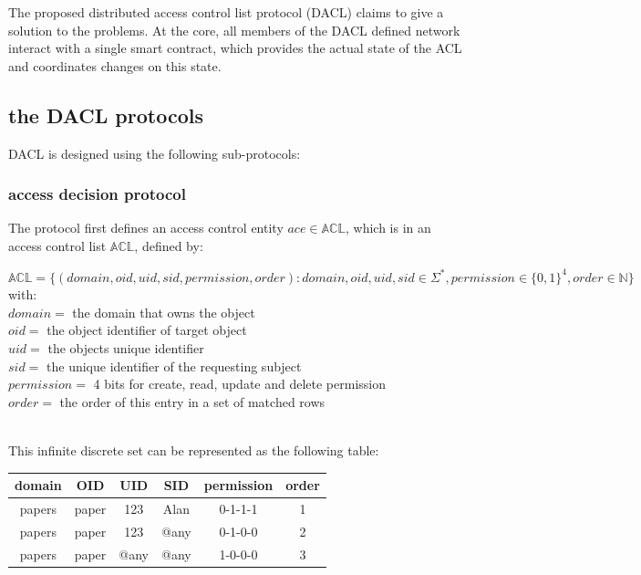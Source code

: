 \documentclass[12pt, conference]{IEEEtran}
\begin{document}
The proposed distributed access control list protocol (DACL) claims to give a solution to the problems. At the core, all members of the DACL defined network interact with a single smart contract, which provides the actual state of the ACL and coordinates changes on this state. 

\newpage

\subsection{the DACL protocols}

DACL is designed using the following sub-protocols:

\subsubsection{access decision protocol}

The protocol first defines an access control entity $ ace \in \mathbb{ACL} $, which is in an access control list $ \mathbb{ACL} $, defined by:
\begin{footnotesize}
$
\mathbb{ACL} = \{ (domain, oid, uid, sid, permission, order) : domain, oid, uid, sid \in \Sigma^*,  permission \in \{0,1\}^4, order \in \mathbb{N} \} 
 $
 with: \\
 $ domain = $ the domain that owns the object  \\
 $ oid = $ the object identifier of target object \\
 $ uid = $ the objects unique identifier \\
 $ sid = $ the unique identifier of the requesting subject \\
 $ permission = $ 4 bits for create, read, update and delete permission \\
 $ order = $ the order of this entry in a set of matched rows \\
 \\
\end{footnotesize}
This infinite discrete set can be represented as the following table:

\begin{table}[!h]
\begin{tabular}{|c|c|c|c|c|c|}
\hline \rule[-2ex]{0pt}{5.5ex} domain & OID & UID & SID & permission & order \\ 
\hline
papers & paper & 123 & Alan & 0-1-1-1 & 1 \\ 
papers & paper & 123 & @any & 0-1-0-0 & 2 \\ 
papers & paper & @any & @any & 1-0-0-0 & 3 \\ 
\hline
\end{tabular}

\end{table}
\end{document}
